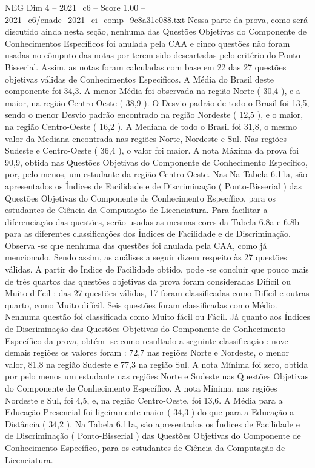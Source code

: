 \begin{textsample}{NEG Dim 4 – 2021\_c6 – Score 1.00 – 2021\_c6/enade\_2021\_ci\_comp\_9c8a31e088.txt}
Nessa parte da prova, como será discutido ainda nesta seção, nenhuma das Questões Objetivas do Componente de Conhecimentos Específicos foi anulada pela CAA e cinco questões não foram usadas no cômputo das notas por terem sido descartadas pelo critério do Ponto-Bisserial.
Assim, as notas foram calculadas com base em 22 das 27 questões objetivas válidas de Conhecimentos Específicos.
A Média do Brasil deste componente foi 34,3.
A menor Média foi observada na região Norte ( 30,4 ), e a maior, na região Centro-Oeste ( 38,9 ).
O Desvio padrão de todo o Brasil foi 13,5, sendo o menor Desvio padrão encontrado na região Nordeste ( 12,5 ), e o maior, na região Centro-Oeste ( 16,2 ).
A Mediana de todo o Brasil foi 31,8, o mesmo valor da Mediana encontrada nas regiões Norte, Nordeste e Sul.
Nas regiões Sudeste e Centro-Oeste ( 36,4 ), o valor foi maior.
A nota Máxima da prova foi 90,9, obtida nas Questões Objetivas do Componente de Conhecimento Específico, por, pelo menos, um estudante da região Centro-Oeste.
Nas Na Tabela 6.11a, são apresentados os Índices de Facilidade e de Discriminação ( Ponto-Bisserial ) das Questões Objetivas do Componente de Conhecimento Específico, para os estudantes de Ciência da Computação de Licenciatura.
Para facilitar a diferenciação das questões, serão usadas as mesmas cores da Tabela 6.8a e 6.8b para as diferentes classificações dos Índices de Facilidade e de Discriminação.
Observa -se que nenhuma das questões foi anulada pela CAA, como já mencionado.
Sendo assim, as análises a seguir dizem respeito às 27 questões válidas.
A partir do Índice de Facilidade obtido, pode -se concluir que pouco mais de três quartos das questões objetivas da prova foram consideradas Difícil ou Muito difícil : das 27 questões válidas, 17 foram classificadas como Difícil e outras quarto, como Muito difícil.
Seis questões foram classificadas como Médio.
Nenhuma questão foi classificada como Muito fácil ou Fácil.
Já quanto aos Índices de Discriminação das Questões Objetivas do Componente de Conhecimento Específico da prova, obtém -se como resultado a seguinte classificação : nove demais regiões os valores foram : 72,7 nas regiões Norte e Nordeste, o menor valor, 81,8 na região Sudeste e 77,3 na região Sul.
A nota Mínima foi zero, obtida por pelo menos um estudante nas regiões Norte e Sudeste nas Questões Objetivas do Componente de Conhecimento Específico.
A nota Mínima, nas regiões Nordeste e Sul, foi 4,5, e, na região Centro-Oeste, foi 13,6.
A Média para a Educação Presencial foi ligeiramente maior ( 34,3 ) do que para a Educação a Distância ( 34,2 ).
Na Tabela 6.11a, são apresentados os Índices de Facilidade e de Discriminação ( Ponto-Bisserial ) das Questões Objetivas do Componente de Conhecimento Específico, para os estudantes de Ciência da Computação de Licenciatura.

\end{textsample}
